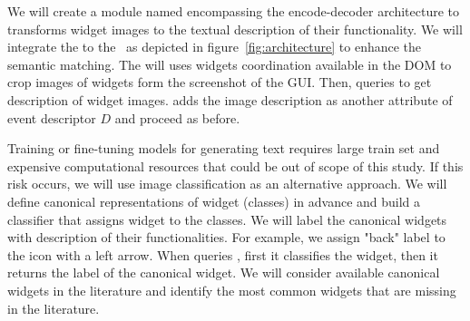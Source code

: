 
\bigskip
We will create a module named \imagelabeler encompassing the encode-decoder architecture to transforms widget images to the textual description of their functionality.
We will integrate the \imagelabeler to the \testreuse~\architecture  as depicted in figure~\ref{fig:architecture} to enhance the semantic matching.
The \ede  will uses widgets coordination available in the DOM to crop images of widgets form the screenshot of the GUI.
Then, \ede queries \imagelabeler to get description of  widget images.
\ede adds the image description as another attribute of event descriptor $D$ and \matcher proceed as before.


\bigskip
Training or fine-tuning models for generating text requires large train set and expensive computational resources that could be out of scope of this study. 
If this risk occurs, we will use image classification as an alternative approach.
We will define canonical representations of widget  (classes) in advance and build a classifier that assigns widget to the classes.
We will label the canonical widgets with description of their functionalities.
For example, we assign "back" label to the icon with a left arrow.
 When \ede queries \imagelabeler, first it classifies the widget, then it returns the label of the canonical widget.
We will consider available canonical widgets in the literature and identify the most common widgets that are missing in the literature. 

















